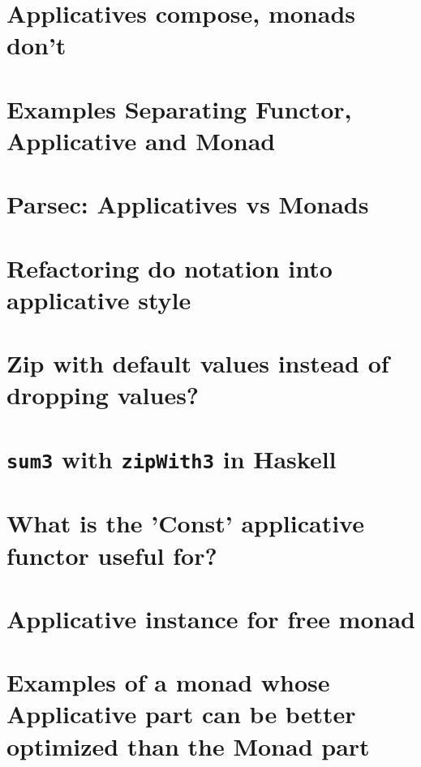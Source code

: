 \documentclass{book}
\begin{document}
\section{Applicatives compose, monads don't}


\section{Examples Separating Functor, Applicative and Monad}


\section{Parsec: Applicatives vs Monads}


\section{Refactoring do notation into applicative style}


\section{Zip with default values instead of dropping values?}


\section{{\tt sum3} with {\tt zipWith3} in Haskell}


\section{What is the 'Const' applicative functor useful for?}


\section{Applicative instance for free monad}


\section{Examples of a monad whose Applicative part can be better optimized than the Monad part}

\end{document}
